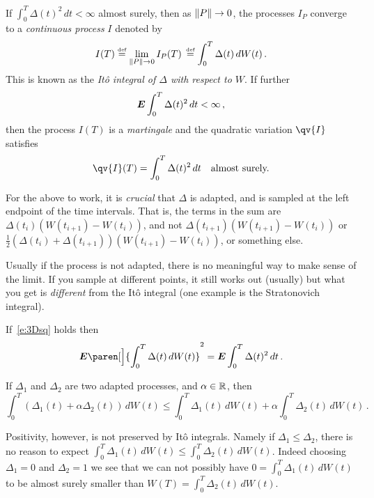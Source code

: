 \begin{theorem}\label{t:3ipconv}
  If $\int_0^T \Delta(t)^2 \, dt < \infty$ almost surely, then as $\lVert P\rVert \to 0$, the processes $I_P$ converge to a \emph{continuous process} $I$ denoted by
  \begin{equation*}
    I(T)
      \stackrel{\scriptscriptstyle\textup{def}}{=} \lim_{\lVert P\rVert \to 0} I_P(T)\,
      \stackrel{\scriptscriptstyle\textup{def}}{=} \int_0^T \Delta(t) \, dW(t)\,.
  \end{equation*}
  This is known as the \emph{It\^o integral of $\Delta$ with respect to $W$}.
  If further
  \begin{equation}\label{e:3Dsq}
    \bm{E} \int_0^T \Delta(t)^2 \, dt < \infty\,,
  \end{equation}
  then the process $I(T)$ is a \emph{martingale} and the quadratic variation $\qv{I}$ satisfies
  \begin{equation*}
    \qv{I}(T) = \int_0^T \Delta(t)^2 \, dt
    \quad\text{almost surely.}
  \end{equation*}
\end{theorem}

\begin{remark}
  For the above to work, it is \emph{crucial} that $\Delta$ is adapted, and is sampled at the left endpoint of the time intervals.
  That is, the terms in the sum are $\Delta(t_i) (W(t_{i+1}) - W(t_i))$, and not $\Delta(t_{i+1}) (W(t_{i+1}) - W(t_i))$ or $\frac{1}{2} (\Delta(t_i) + \Delta(t_{i+1})) (W(t_{i+1}) - W(t_i))$, or something else.

  Usually if the process is not adapted, there is no meaningful way to make sense of the limit.
  If you sample at different points, it still works out (usually) but what you get is \emph{different} from the It\^o integral (one example is the Stratonovich integral). 
\end{remark}

\begin{corollary}[It\^o Isometry]
  If~\eqref{e:3Dsq} holds then
  \begin{equation*}
    \E \paren[\Big]{ \int_0^T \Delta(t) \, dW(t) }^2
      = \E \int_0^T \Delta(t)^2 \, dt\,.
  \end{equation*}
\end{corollary}

\begin{proposition}[Linearity]
  If $\Delta_1$ and $\Delta_2$ are two adapted processes, and $\alpha \in \mathbb{R}$, then
  \begin{equation*}
    \int_0^T (\Delta_1(t) + \alpha \Delta_2(t)) \, dW(t) 
      \leq \int_0^T \Delta_1(t) \, dW(t) + \alpha \int_0^T \Delta_2(t) \, dW(t)\,.
  \end{equation*}
\end{proposition}
\begin{remark}
  Positivity, however, is not preserved by It\^o integrals.
  Namely if $\Delta_1 \leq \Delta_2$, there is no reason to expect $\int_0^T \Delta_1(t) \, dW(t) \leq \int_0^T \Delta_2(t) \, dW(t)$.
  Indeed choosing $\Delta_1 = 0$ and $\Delta_2 = 1$ we see that we can not possibly have $0 = \int_0^T \Delta_1(t) \, dW(t)$ to be almost surely smaller than $W(T) = \int_0^T \Delta_2(t) \, dW(t)$.
\end{remark}


